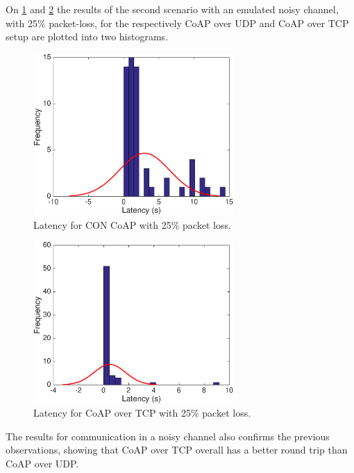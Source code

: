 On \figurename{\ref{fig:coapoverudploss}} and \figurename{\ref{fig:coapovertcploss}} the results of the second scenario with an emulated noisy channel, with 25\% packet-loss, for the respectively CoAP over UDP and CoAP over TCP setup are plotted into two histograms. 
\begin{figure}[bh]
	\centering
	\includegraphics[width=3in]{gfx/coapoverudp25loss}
	\caption{Latency for CON CoAP with 25\% packet loss.}
	\label{fig:coapoverudploss}
\end{figure}
\begin{figure}[bh]
	\centering
	\includegraphics[width=3in]{gfx/coapovertcp25loss}
	\caption{Latency for CoAP over TCP with 25\% packet loss.}
	\label{fig:coapovertcploss}
\end{figure}

The results for communication in a noisy channel also confirms the previous observations, showing that CoAP over TCP overall has a better round trip than CoAP over UDP. %
